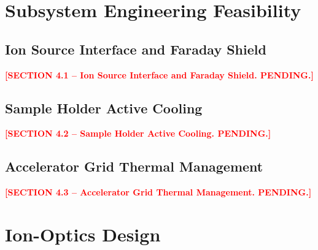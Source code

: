 \documentclass[]{interact}
\newcommand{\INSERT}[1]{\textcolor{red}{\textbf{[#1]}}}
\begin{document}
\section{Subsystem Engineering Feasibility}
\label{sec:subsystems}

\subsection{Ion Source Interface and Faraday Shield}
\label{sec:faraday}

\INSERT{SECTION 4.1 -- Ion Source Interface and Faraday Shield. PENDING.}

\subsection{Sample Holder Active Cooling}
\label{sec:sample_holder}

\INSERT{SECTION 4.2 -- Sample Holder Active Cooling. PENDING.}

\subsection{Accelerator Grid Thermal Management}
\label{sec:grid_cooling}

\INSERT{SECTION 4.3 -- Accelerator Grid Thermal Management. PENDING.}


\section{Ion-Optics Design}
\label{sec:ion_optics}
\end{document}
